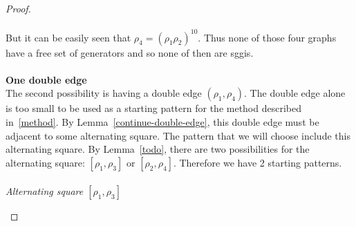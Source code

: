 \begin{proof}
\paragraph{}
But it can be easily seen that $\rho_4 = (\rho_1 \rho_2)^{10}$. Thus none of those four graphs have a free set of generators and so none of then are sggis.

\paragraph{}
\textbf{One double edge}\\
The second possibility is having a double edge $(\rho_1, \rho_4)$. The double edge alone is too small to be used as a starting pattern for the method described in~\ref{method}. By Lemma~\ref{continue-double-edge}, this double edge must be adjacent to some alternating square. The pattern that we will choose include this alternating square. By Lemma~\ref{todo}, there are two possibilities for the alternating square: $[\rho_1, \rho_3]$ or $[\rho_2, \rho_4]$. Therefore we have 2 starting patterns.

\paragraph{}
\textit{Alternating square $[\rho_1, \rho_3]$}

\begin{figure}[H]
  \begin{center}
\end{center}
\end{figure}
\end{proof}
